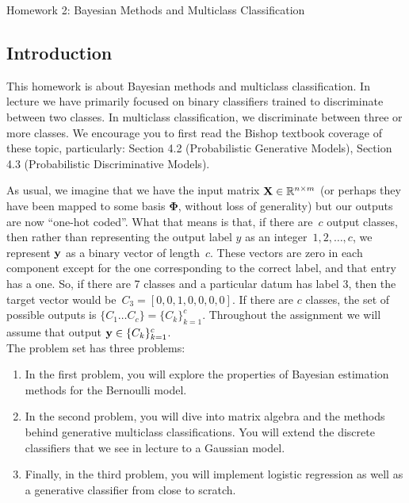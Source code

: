 \documentclass[submit]{harvardml}
\begin{document}
{
  \begin{center}
{\Large Homework 2: Bayesian Methods and Multiclass Classification}\\
\end{center}
}
\subsection*{Introduction}

This homework is about Bayesian methods and multiclass
classification. In lecture we have primarily focused on binary
classifiers trained to discriminate between two classes. In multiclass
classification, we discriminate between three or more classes. We
encourage you to first read the Bishop textbook coverage of these
topic, particularly: Section 4.2 (Probabilistic Generative Models),
Section 4.3 (Probabilistic Discriminative Models).

As usual, we imagine that we have the input matrix $\mathbf{X} \in
\mathbb{R}^{n \times m}$ (or perhaps they have been mapped to some basis
$\bm{\Phi}$, without loss of generality) but our outputs are now
``one-hot coded''.  What that means is that, if there are~$c$ output
classes, then rather than representing the output label $y$ as an
integer~${1,2,\ldots,c}$, we represent $\mathbf{y}$ as a binary vector of
length~$c$. These vectors are zero in each component except for the
one corresponding to the correct label, and that entry has a one.  So,
if there are 7 classes and a particular datum has label 3, then the
target vector would be~${C_3 = [0,0,1,0,0,0,0]}$.  If there are $c$
classes, the set of possible outputs is $\{C_1 \ldots C_c \} =
\{C_k\}_{k=1}^c$.  Throughout the assignment we will assume that
output $\mathbf{y} \in \{C_k\}_{k=1}^c$.\\

The problem set has three problems:
\begin{enumerate}
\item In the first problem, you will explore the properties of
  Bayesian estimation methods for the Bernoulli model.
%
\item In the second problem, you will dive into matrix algebra and the
  methods behind generative multiclass classifications. You will
  extend the discrete classifiers that we see in lecture to a Gaussian
  model.
%
\item Finally, in the third problem, you will implement logistic
  regression as well as a generative classifier from close to scratch.
%
\end{enumerate}
\end{document}
